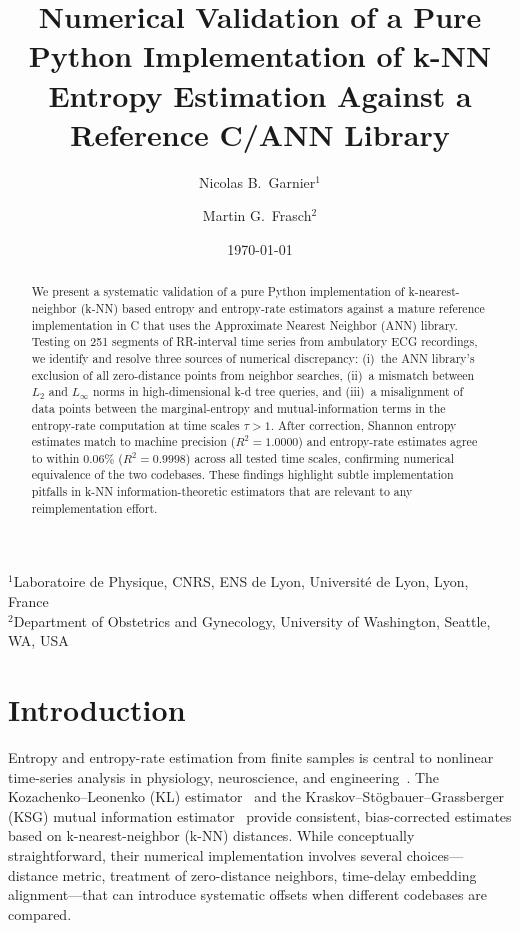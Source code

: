 \documentclass[12pt,a4paper]{article}
\title{Numerical Validation of a Pure Python Implementation of k-NN Entropy Estimation Against a Reference C/ANN Library}
\author{Nicolas B.\ Garnier$^{1}$ \and Martin G.\ Frasch$^{2}$}
\date{\today}
\newcommand{\affiliations}{%
$^{1}$Laboratoire de Physique, CNRS, ENS de Lyon, Universit\'{e} de Lyon, Lyon, France\\
$^{2}$Department of Obstetrics and Gynecology, University of Washington, Seattle, WA, USA
}
\begin{document}
\maketitle
\begingroup
\centering
\small
\affiliations
\par
\endgroup
\vspace{1em}

\begin{abstract}
We present a systematic validation of a pure Python implementation of k-nearest-neighbor (k-NN) based entropy and entropy-rate estimators against a mature reference implementation in C that uses the Approximate Nearest Neighbor (ANN) library.
Testing on 251 segments of RR-interval time series from ambulatory ECG recordings, we identify and resolve three sources of numerical discrepancy: (i)~the ANN library's exclusion of all zero-distance points from neighbor searches, (ii)~a mismatch between $L_2$ and $L_\infty$ norms in high-dimensional k-d tree queries, and (iii)~a misalignment of data points between the marginal-entropy and mutual-information terms in the entropy-rate computation at time scales $\tau > 1$.
After correction, Shannon entropy estimates match to machine precision ($R^2 = 1.0000$) and entropy-rate estimates agree to within $0.06\%$ ($R^2 = 0.9998$) across all tested time scales, confirming numerical equivalence of the two codebases.
These findings highlight subtle implementation pitfalls in k-NN information-theoretic estimators that are relevant to any reimplementation effort.
\end{abstract}

\section{Introduction}\label{sec:intro}

Entropy and entropy-rate estimation from finite samples is central to nonlinear time-series analysis in physiology, neuroscience, and engineering~\citep{kozachenko1987,kraskov2004}.
The Kozachenko--Leonenko (KL) estimator~\citep{kozachenko1987} and the Kraskov--St\"ogbauer--Grassberger (KSG) mutual information estimator~\citep{kraskov2004} provide consistent, bias-corrected estimates based on k-nearest-neighbor (k-NN) distances.
While conceptually straightforward, their numerical implementation involves several choices---distance metric, treatment of zero-distance neighbors, time-delay embedding alignment---that can introduce systematic offsets when different codebases are compared.
\end{document}
